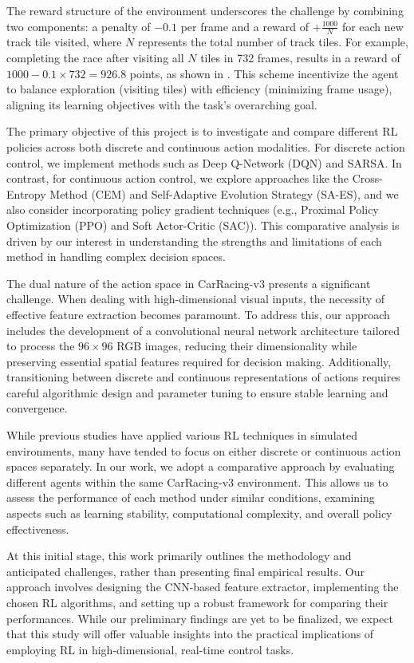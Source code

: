 \documentclass[../CSC_52081_EP.tex]{subfiles}
\begin{document}
The reward structure of the environment underscores the challenge by combining two components: a penalty of \(-0.1\) per frame and a reward of \(+\frac{1000}{N}\) for each new track tile visited, where \(N\) represents the total number of track tiles. For example, completing the race after visiting all \(N\) tiles in 732 frames, results in a reward of \(1000 - 0.1 \times 732 = 926.8\) points, as shown in \cite{gymnasium}. This scheme incentivize the agent to balance exploration (visiting tiles) with efficiency (minimizing frame usage), aligning its learning objectives with the task's overarching goal.

The primary objective of this project is to investigate and compare different RL policies across both discrete and continuous action modalities. For discrete action control, we implement methods such as Deep Q-Network (DQN) and SARSA. In contrast, for continuous action control, we explore approaches like the Cross-Entropy Method (CEM) and Self-Adaptive Evolution Strategy (SA-ES), and we also consider incorporating policy gradient techniques (e.g., Proximal Policy Optimization (PPO) and Soft Actor-Critic (SAC)). This comparative analysis is driven by our interest in understanding the strengths and limitations of each method in handling complex decision spaces.

The dual nature of the action space in CarRacing-v3 presents a significant challenge. When dealing with high-dimensional visual inputs, the necessity of effective feature extraction becomes paramount. To address this, our approach includes the development of a convolutional neural network architecture tailored to process the \(96\times96\) RGB images, reducing their dimensionality while preserving essential spatial features required for decision making. Additionally, transitioning between discrete and continuous representations of actions requires careful algorithmic design and parameter tuning to ensure stable learning and convergence.

While previous studies have applied various RL techniques in simulated environments, many have tended to focus on either discrete or continuous action spaces separately. In our work, we adopt a comparative approach by evaluating different agents within the same CarRacing-v3 environment. This allows us to assess the performance of each method under similar conditions, examining aspects such as learning stability, computational complexity, and overall policy effectiveness.

At this initial stage, this work primarily outlines the methodology and anticipated challenges, rather than presenting final empirical results. Our approach involves designing the CNN-based feature extractor, implementing the chosen RL algorithms, and setting up a robust framework for comparing their performances. While our preliminary findings are yet to be finalized, we expect that this study will offer valuable insights into the practical implications of employing RL in high-dimensional, real-time control tasks.
\end{document}
